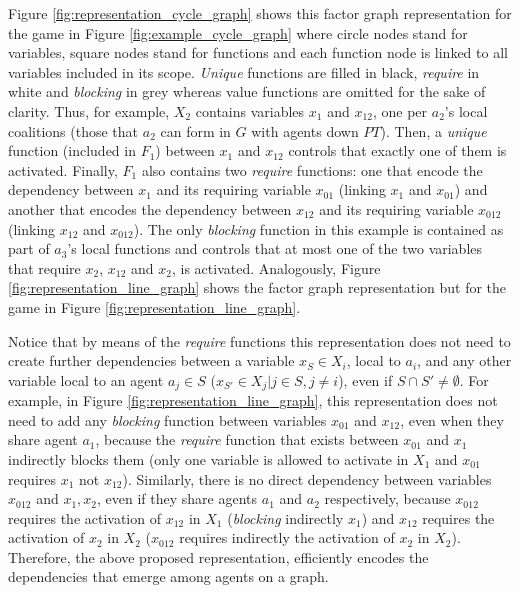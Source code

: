 \documentclass{aamas2012}
\begin{document}
Figure \ref{fig:representation_cycle_graph} shows this factor graph
representation for the game in Figure \ref{fig:example_cycle_graph} where circle
nodes stand for variables, square nodes stand for functions and each function
node is linked to all variables included in its scope. \emph{Unique} functions
are filled in black, \emph{require} in white and \emph{blocking} in grey whereas value functions are omitted
for the sake of clarity. Thus, for example, $X_{2}$ contains variables $x_1$ and
$x_{12}$, one per $a_2$'s local coalitions (those that
$a_2$ can form in $G$ with agents down $PT$). Then, a \emph{unique} function (included
in $F_1$) between $x_1$ and $x_{12}$ controls that exactly one of them is
activated. Finally, $F_1$ also contains two \emph{require} functions: one that encode
the dependency between $x_1$ and its requiring variable $x_{01}$ (linking $x_1$
and $x_{01}$) and another that encodes the dependency between $x_{12}$ and its
requiring variable $x_{012}$ (linking $x_{12}$ and $x_{012}$). The only \emph{blocking}
function in this example is contained as part of $a_3$'s local functions and
controls that at most one of the two variables that require $x_2$, $x_{12}$ and
$x_2$, is activated. Analogously, Figure \ref{fig:representation_line_graph} shows the factor graph representation but for the game in Figure
\ref{fig:representation_line_graph}.

Notice that by means of the \emph{require} functions this representation does not need
to create further dependencies between a variable $x_S\in X_i$, local to 
$a_i$, and any other variable local to an agent $a_j \in
S$ ($x_{S'}\in X_j\vert j\in S, j\neq i$), even if $S\cap S'\neq \emptyset$.
 For example, in Figure \ref{fig:representation_line_graph}, this
representation does not need to add any \emph{blocking} function between variables
$x_{01}$ and $x_{12}$, even when they share agent $a_1$, because the \emph{require}
function that exists between $x_{01}$ and $x_1$ indirectly blocks them (only one
variable is allowed to activate in $X_1$ and $x_{01}$ requires $x_1$ not
$x_{12}$). Similarly, there is no direct dependency between variables $x_{012}$
and $x_{1},x_{2}$, even if they share agents $a_1$ and $a_2$ respectively,
because $x_{012}$ requires the activation of $x_{12}$ in $X_1$ (\emph{blocking}
indirectly $x_{1}$) and $x_{12}$ requires the activation of $x_2$ in $X_2$
($x_{012}$ requires indirectly the activation of $x_2$ in $X_2$). Therefore, the
above proposed representation, 
efficiently encodes the dependencies that emerge among agents on a graph.
\end{document}
